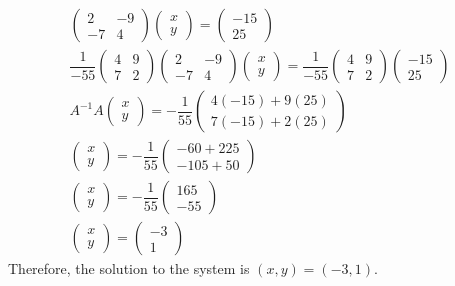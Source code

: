 \documentclass[11pt,letterpaper]{article}
\begin{document}
	\[
	\begin{gathered}
	\begin{pmatrix} 2 & -9 \\ -7 & 4 \end{pmatrix} \begin{pmatrix} x \\ y \end{pmatrix}= \begin{pmatrix} -15 \\ 25 \end{pmatrix} \\[0.3cm]
	\dfrac{1}{-55} \begin{pmatrix} 4 & 9 \\ 7 & 2 \end{pmatrix} \begin{pmatrix} 2 & -9 \\ -7 & 4 \end{pmatrix} \begin{pmatrix} x \\ y \end{pmatrix}= \dfrac{1}{-55} \begin{pmatrix} 4 & 9 \\ 7 & 2 \end{pmatrix} \begin{pmatrix} -15 \\ 25 \end{pmatrix} \\[0.3cm]	
	A^{-1}A \begin{pmatrix} x \\ y \end{pmatrix}= 
	-\dfrac{1}{55} \begin{pmatrix} 4(-15) + 9(25) \\ 7(-15) + 2(25) \end{pmatrix} \\[0.3cm]
	\begin{pmatrix} x \\ y \end{pmatrix}= -\dfrac{1}{55} \begin{pmatrix} -60 + 225 \\ -105 + 50 \end{pmatrix} \\[0.3cm]
	\begin{pmatrix} x \\ y \end{pmatrix}= -\dfrac{1}{55} \begin{pmatrix} 165 \\ -55 \end{pmatrix} \\[0.3cm]
	\begin{pmatrix} x \\ y \end{pmatrix}= \begin{pmatrix} -3 \\ 1 \end{pmatrix}
	\end{gathered}
	\] \pspace
Therefore, the solution to the system is $(x, y)= (-3, 1)$. 
\end{document}
